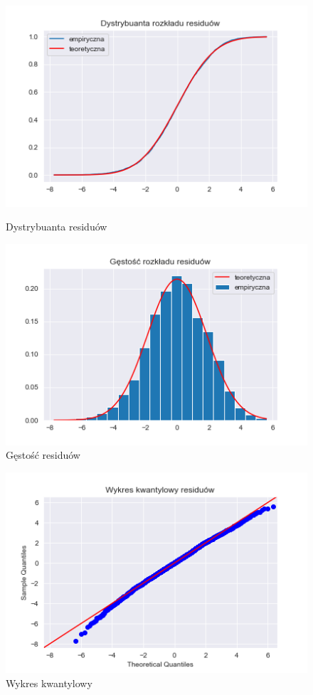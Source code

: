 \documentclass{article}
\theoremstyle{break}
\begin{document}
	\begin{figure}[H]
		\begin{center}
			\begin{minipage}{0.49\linewidth}
				\centering
				\includegraphics[scale=0.5]{res_dist.png}
				\caption{Dystrybuanta residuów}
				\label{fig:res_dist}
			\end{minipage}
			\begin{minipage}{0.49\linewidth}
				\centering
				\includegraphics[scale=0.5]{res_pdf.png}
				\caption{Gęstość residuów}
				\label{fig:res_pdf}
			\end{minipage}
		\end{center}
	\end{figure}
	


	\begin{figure}[H]
		\begin{center}
			\includegraphics[scale=0.55]{res_qq.png}
			\caption{Wykres kwantylowy}
			\label{fig:res_qq}
		\end{center}
	\end{figure}
	
\end{document}
